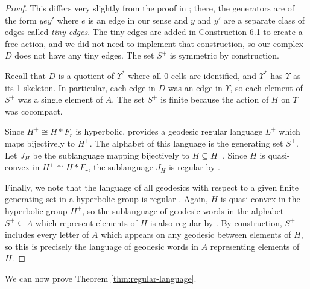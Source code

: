 \documentclass[11pt,letterpaper]{amsart}
\theoremstyle{definition}
\theoremstyle{plain}
\theoremstyle{TheoremNum}
\begin{document}
\begin{proof}
        This differs very slightly from the proof in \cite{DFW}; there, the generators are of the form $y e y'$ where $e$ is an edge in our sense and $y$ and $y'$ are a separate class of edges called \emph{tiny edges}. The tiny edges are added in Construction 6.1 to create a free action, and we did not need to implement that construction, so our complex $D$ does not have any tiny edges. The set $S^{+}$ is symmetric by construction.

        Recall that $D$ is a quotient of $\Upsilon^{*}$ where all 0-cells are identified, and $\Upsilon^{*}$ has $\Upsilon$ as its 1-skeleton. In particular, each edge in $D$ was an edge in $\Upsilon$, so each element of $S^{+}$ was a single element of $A$. The set $S^{+}$ is finite because the action of $H$ on $\Upsilon$ was cocompact.

        Since $H^{+} \cong H * F_r$ is hyperbolic, \cite[Theorem~11.27]{Cannon-regular-language} provides a geodesic regular language $L^{+}$ which maps bijectively to $H^{+}$. The alphabet of this language is the generating set $S^{+}$. Let $J_H$ be the sublanguage mapping bijectively to $H \subseteq H^{+}$. Since $H$ is quasi-convex in $H^{+} \cong H * F_r$, the sublanguage $J_H$ is regular by \cite[Theorem2.2]{Gersten-Short}.

        Finally, we note that the language of all geodesics with respect to a given finite generating set in a hyperbolic group is regular \cite{Cannon-regular-geodesics}. Again, $H$ is quasi-convex in the hyperbolic group $H^{+}$, so the sublanguage of geodesic words in the alphabet $S^{+} \subseteq A$ which represent elements of $H$ is also regular by \cite[Theorem~2.2]{Gersten-Short}. By construction, $S^{+}$ includes every letter of $A$ which appears on any geodesic between elements of $H$, so this is precisely the language of geodesic words in $A$ representing elements of $H$.
 \end{proof}

We can now prove Theorem \ref{thm:regular-language}.\smallskip
\end{document}
